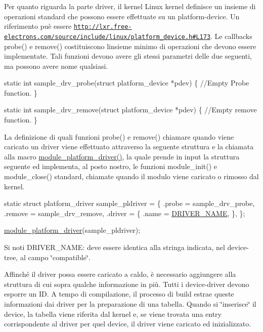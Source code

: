 Per quanto riguarda la parte driver, il kernel Linux kernel definisce un insieme di operazioni standard che possono essere effettuate su un platform-\/device. Un riferimento puè essere \href{http://lxr.free-electrons.com/source/include/linux/platform_device.h#L173}{\tt http\+://lxr.\+free-\/electrons.\+com/source/include/linux/platform\+\_\+device.\+h\#\+L173}. Le callbacks probe() e remove() costituiscono l\textquotesingle{}insieme minimo di operazioni che devono essere implementate. Tali funzioni devono avere gli stessi parametri delle due seguenti, ma possono avere nome qualsiasi.


\begin{DoxyCode}
\textcolor{keyword}{static} \textcolor{keywordtype}{int} sample\_drv\_probe(\textcolor{keyword}{struct} platform\_device *pdev) \{
        \textcolor{comment}{//Empty Probe function.}
\}

\textcolor{keyword}{static} \textcolor{keywordtype}{int} sample\_drv\_remove(\textcolor{keyword}{struct} platform\_device *pdev) \{
        \textcolor{comment}{//Empty remove function.}
\}
\end{DoxyCode}


La definizione di quali funzioni probe() e remove() chiamare quando viene caricato un driver viene effettuato attraverso la seguente struttura e la chiamata alla macro \hyperlink{group___linux-_driver_ga61e890be90fe5582db8048893ca0ebbf}{module\+\_\+platform\+\_\+driver()}, la quale prende in input la struttura seguente ed implementa, al posto nostro, le funzioni module\+\_\+init() e module\+\_\+close() standard, chiamate quando il modulo viene caricato o rimosso dal kernel.


\begin{DoxyCode}
\textcolor{keyword}{static} \textcolor{keyword}{struct }platform\_driver sample\_pldriver = \{
    .probe  = sample\_drv\_probe,
    .remove = sample\_drv\_remove,
    .driver = \{
        .name  = \hyperlink{group___linux-_driver_ga25634d21648ca7fb7a2aca614bafaaeb}{DRIVER\_NAME},
    \},
\};

\hyperlink{group___linux-_driver_ga61e890be90fe5582db8048893ca0ebbf}{module\_platform\_driver}(sample\_pldriver);
\end{DoxyCode}


Si noti D\+R\+I\+V\+E\+R\+\_\+\+N\+A\+ME\+: deve essere identica alla stringa indicata, nel device-\/tree, al campo \char`\"{}compatible\char`\"{}.

Affinché il driver possa essere caricato a caldo, è necessario aggiungere alla struttura di cui sopra qualche informazione in più. Tutti i device-\/driver devono esporre un ID. A tempo di compilazione, il processo di build estrae queste informazioni dai driver per la preparazione di una tabella. Quando si \char`\"{}inserisce\char`\"{} il device, la tabella viene riferita dal kernel e, se viene trovata una entry corrispondente al driver per quel device, il driver viene caricato ed inizializzato.

